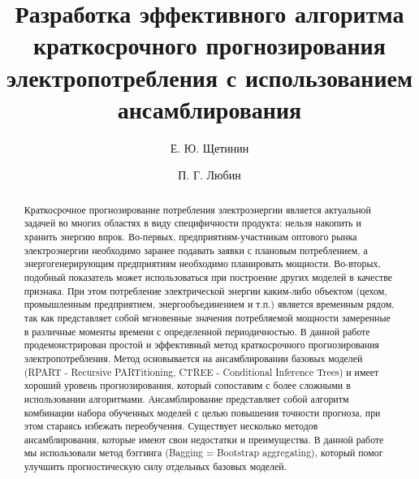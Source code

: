 \documentclass[60x84/16,8pt]{ittmm}
\begin{document}

\title{Разработка эффективного алгоритма краткосрочного прогнозирования электропотребления с использованием ансамблирования}

\author[1]{Е. Ю. Щетинин}
\author[1]{П. Г. Любин}


\address[1]{Кафедра прикладной информатики и теории вероятностей,\\
  Российский университет дружбы народов,\\
  ул. Миклухо-Маклая, д.6, Москва, Россия, 117198}


\begin{abstract}
Краткосрочное прогнозирование потребления электроэнергии является актуальной
задачей во многих областях в виду специфичности продукта: нельзя накопить и
хранить энергию впрок. Во-первых, предприятиям-участникам оптового рынка
электроэнергии необходимо заранее подавать заявки с плановым потреблением, а
энергогенерирующим предприятиям необходимо планировать мощности. Во-вторых,
подобный показатель может использоваться при построение других моделей в
качестве признака. При этом потребление электрической энергии каким-либо
объектом (цехом, промышленным предприятием, энергообъединением и т.п.) является
временным рядом, так как представляет собой мгновенные значения потребляемой
мощности замеренные в различные моменты времени с определенной периодичностью. В
данной работе продемонстрирован простой и эффективный метод краткосрочного
прогнозирования электропотребления. Метод основывается на ансамблировании
базовых моделей (RPART - Recursive PARTitioning, CTREE - Conditional Inference
Trees) и имеет хороший уровень прогнозирования, который сопоставим с более
сложными в использовании алгоритмами. Ансамблирование представляет собой
алгоритм комбинации набора обученных моделей с целью повышения точности
прогноза, при этом стараясь избежать переобучения. Существует несколько методов
ансамблирования, которые имеют свои недостатки и преимущества. В данной работе
мы использовали метод бэггинга (Bagging = Bootstrap aggregating), который помог
улучшить прогностическую силу отдельных базовых моделей.
\end{abstract}


\end{document}
